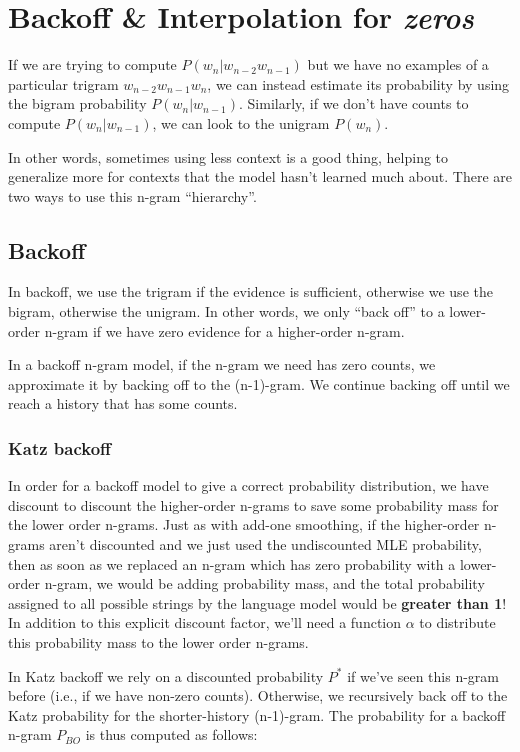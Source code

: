 \section{Backoff \& Interpolation for \textit{zeros} \cite{nlp-1}}
If we are trying to compute $P(w_n|w_{n-2}w_{n-1})$ but we have no examples of a particular trigram $w_{n-2}w_{n-1}w_n$, we can instead estimate its probability by using the bigram probability $P(w_n|w_{n-1})$. Similarly, if we don’t have counts to compute $P(w_n|w_{n-1})$, we can look to the unigram $P(w_n)$.

In other words, sometimes using less context is a good thing, helping to generalize more for contexts that the model hasn’t learned much about. There are two ways to use this n-gram “hierarchy”.

\subsection{Backoff}
In backoff, we use the trigram if the evidence is sufficient, otherwise we use the bigram, otherwise the unigram. In other words, we only “back off” to a lower-order n-gram if we have zero evidence for a higher-order n-gram. 

In a backoff n-gram model, if the n-gram we need has zero counts, we approximate it by backing off to the (n-1)-gram. We continue backing off until we reach a history that has some counts.

\subsubsection{Katz backoff}

In order for a backoff model to give a correct probability distribution, we have discount to discount the higher-order n-grams to save some probability mass for the lower order n-grams. Just as with add-one smoothing, if the higher-order n-grams aren’t discounted and we just used the undiscounted MLE probability, then as soon as we replaced an n-gram which has zero probability with a lower-order n-gram, we would be adding probability mass, and the total probability assigned to all possible strings by the language model would be \textbf{greater than 1}! In addition to this explicit discount factor, we’ll need a function $\alpha$ to distribute this probability mass to the lower order n-grams.

In Katz backoff we rely on a discounted probability $P^*$
if we’ve seen this n-gram before (i.e., if we have non-zero counts). Otherwise, we recursively back off to the Katz probability for the shorter-history (n-1)-gram. The probability for a backoff n-gram $P_{BO}$ is thus computed as follows:

